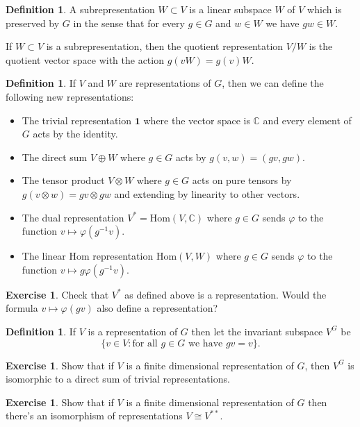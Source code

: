 \documentclass[11pt]{article}
\theoremstyle{plain}
\theoremstyle{definition}
\newtheorem{definition}[proposition]{Definition}
\newtheorem{exercise}[proposition]{Exercise}
\theoremstyle{remark}
\begin{document}
\begin{definition}
A subrepresentation $W \subset V$ is a linear subspace $W$ of $V$ which is preserved by $G$ in the sense that for every $g \in G$ and $w \in W$ we have $gw \in W$.

If $W \subset V$ is a subrepresentation, then the quotient representation $V/W$ is the quotient vector space with the action $g(vW) = g(v)W$.
\end{definition}

\begin{definition}
If $V$ and $W$ are representations of $G$, then we can define the following new representations:
\begin{itemize}
\item The trivial representation $\mathbf{1}$ where the vector space is $\mathbb{C}$ and every element of $G$ acts by the identity.
\item The direct sum $V \oplus W$ where $g \in G$ acts by $g(v,w) = (gv,gw)$.
\item The tensor product $V \otimes W$ where $g \in G$ acts on pure tensors by $g(v \otimes w) = g v \otimes g w$ and extending by linearity to other vectors.
\item The dual representation $V^* = \mathrm{Hom}(V,\mathbb{C})$ where $g \in G$ sends $\varphi$ to the function $v \mapsto \varphi(g^{-1}v)$.
\item The linear Hom representation $\mathrm{Hom}(V,W)$ where $g \in G$ sends $\varphi$ to the function $v \mapsto g \varphi(g^{-1} v)$.
\end{itemize}
\end{definition}

\begin{exercise}
Check that $V^*$ as defined above is a representation.  Would the formula $v \mapsto \varphi(gv)$ also define a representation?
\end{exercise}

\begin{definition}
If $V$ is a representation of $G$ then let the invariant subspace $V^G$ be  
$$\{v \in V: \text{for all $g \in G$ we have } g v = v\}.$$
\end{definition}

\begin{exercise}
Show that if $V$ is a finite dimensional representation of $G$, then $V^G$ is isomorphic to a direct sum of trivial representations.
\end{exercise}

\begin{exercise}
Show that if $V$ is a finite dimensional representation of $G$ then there's an isomorphism of representations $V \cong V^{**}$.
\end{exercise}
\end{document}
